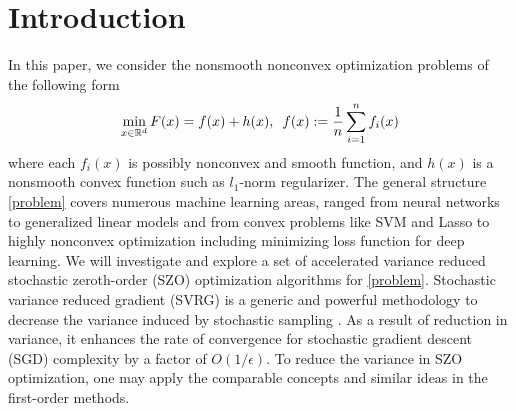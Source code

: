\section{Introduction}
In this paper, we consider the nonsmooth nonconvex optimization problems of the following form
\begin{equation}\label{problem}
\min_{x\in\mathbb{R}^d} F(x) =  f(x) + h(x),\,\,\,f(x):=\frac{1}{n}\sum_{i=1}^n f_i(x)
\end{equation}
where each $f_i(x)$ is possibly nonconvex and smooth function, and $h(x)$ is a nonsmooth convex function such as $l_1$-norm regularizer. 
The general structure \eqref{problem} covers
numerous machine learning areas, ranged from neural networks to  generalized linear models  
 and from convex problems like  SVM  and Lasso to highly nonconvex optimization including minimizing loss function for deep learning. We will investigate and explore a set of accelerated variance reduced stochastic zeroth-order (SZO) optimization algorithms for \eqref{problem}. Stochastic variance reduced gradient
(SVRG) is a generic and powerful methodology to decrease the variance induced by stochastic sampling \cite{johnson2013accelerating,reddi2016stochastic,nitanda2016accelerated,allen2016improved,lei2017non}. As a result of reduction in variance, it enhances the rate of convergence for stochastic gradient descent (SGD) complexity by a factor of $O(1/{\epsilon})$. To reduce the variance in SZO optimization, one may apply the comparable concepts and similar ideas in the first-order methods. 
\iffalse
\subsection{Background in research}
In recent years, there has been thorough studies for convex problems of the form \eqref{problem} (see e.g., \cite{nesterov2013gradient}, \cite{xiao2014proximal,defazio2014saga,lan2017optimal,allen2017katyusha}. 
In particular, in \cite{beck2009fast} a fast-converging class of proximal gradient (PG) schemes for problems with convex structure based on Nesterov's momentum acceleration are designed.  
\cite{xiao2014proximal} developed an algorithm called Prox-SVRG for large-scale problems, which
obtains a linear rate of convergence when each  $f_i$ is strongly-convex. Several stochastic PG methods were developed in \cite{bertsekas2011incremental,xiao2014proximal}  to deal with the large-scale convex problems. Because of growing applications of deep neural networks, recently the studies for nonconvex case have been noticeably growing. Nevertheless, for the generic nonsmooth nonconvex problems, the analysis is still rather sparse.  \cite{li2015accelerated} introduced a set of fast-converging PG algorithms for nonconvex structure problems. Similarly, \cite{ghadimi2016accelerated,reddi2016proximal} studied stochastic PG methods for nonconvex optimization.
Recently, \cite{li2018simple} designed an algorithm by extending the results from \cite{reddi2016proximal}, leading to an improved iteration complexity for stochastic gradient method. 
\fi

